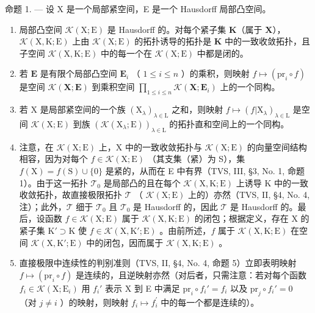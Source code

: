 命题 1. --- 设 X 是一个局部紧空间，E 是一个 Hausdorff 局部凸空间。

\begin{enumerate}
\def\labelenumi{(\roman{enumi})}
\item
  局部凸空间 \(\mathcal{K}(\mathrm{X};\mathrm{E})\) 是 Hausdorff 的。对每个紧子集 \(\mathbf{K}\)（属于 \(\mathbf{X}\)），\(\mathcal{K}(\mathrm{X},\mathrm{K};\mathrm{E})\) 上由 \(\mathcal{K}(\mathrm{X};\mathrm{E})\) 的拓扑诱导的拓扑是 \(\mathbf{K}\) 中的一致收敛拓扑，且子空间 \(\mathcal{K}(\mathrm{X},\mathrm{K};\mathrm{E})\) 中的每一个在 \(\mathcal{K}(\mathrm{X};\mathrm{E})\) 中都是闭的。
\item
  若 \(\mathbf{E}\) 是有限个局部凸空间 \(\mathbf{E}_i\) （ \(1 \leqslant i \leqslant n\) ）的乘积，则映射 \(f \mapsto (\mathrm{pr}_i \circ f)\) 是空间 \(\mathcal{K}(\mathbf{X};\mathbf{E})\) 到乘积空间 \(\prod_{1 \leqslant i \leqslant n} \mathcal{K}(\mathbf{X};\mathbf{E}_i)\) 上的一个同构。
\item
  若 \(\mathrm{X}\) 是局部紧空间的一个族 \((\mathrm{X}_{\lambda})_{\lambda \in \mathrm{L}}\) 之和，则映射 \(f \mapsto (f|\mathrm{X}_{\lambda})_{\lambda \in \mathrm{L}}\) 是空间 \(\mathcal{K}(\mathrm{X};\mathrm{E})\) 到族 \((\mathcal{K}(\mathrm{X}_{\lambda};\mathrm{E}))_{\lambda \in \mathrm{L}}\) 的拓扑直和空间上的一个同构。
\item
  注意，在 \(\mathcal{K}(\mathrm{X};\mathrm{E})\) 上，X 中的一致收敛拓扑与 \(\mathcal{K}(\mathrm{X};\mathrm{E})\) 的向量空间结构相容，因为对每个 \(f\in \mathcal{K}(\mathrm{X};\mathrm{E})\) （其支集（紧）为 S），集 \(f(\mathrm{X}) = f(\mathrm{S})\cup \{0\}\) 是紧的，从而在 E 中有界（TVS, III, §3, No. 1, 命题 1）。由于这一拓扑 \(\mathcal{T}_0\) 是局部凸的且在每个 \(\mathcal{K}(\mathrm{X},\mathrm{K};\mathrm{E})\) 上诱导 K 中的一致收敛拓扑，故直接极限拓扑 \(\mathcal{T}\) （ \(\mathcal{K}(\mathrm{X};\mathrm{E})\) 上的）亦然（TVS, II, §4, No. 4, 注）；此外，\(\mathcal{T}\) 细于 \(\mathcal{T}_0\) 且 \(\mathcal{T}_0\) 是 Hausdorff 的，因此 \(\mathcal{T}\) 是 Hausdorff 的。最后，设函数 \(f\in \mathcal{K}(\mathrm{X};\mathrm{E})\) 属于 \(\mathcal{K}(\mathrm{X},\mathrm{K};\mathrm{E})\) 的闭包；根据定义，存在 X 的紧子集 \(\mathrm{K}'\supset \mathrm{K}\) 使 \(f\in \mathcal{K}(\mathrm{X},\mathrm{K}';\mathrm{E})\) 。由前所述，\(f\) 属于 \(\mathcal{K}(\mathrm{X},\mathrm{K};\mathrm{E})\) 在空间 \(\mathcal{K}(\mathrm{X},\mathrm{K}';\mathrm{E})\) 中的闭包，因而属于 \(\mathcal{K}(\mathrm{X},\mathrm{K};\mathrm{E})\) 。
\item
  直接极限中连续性的判别准则（TVS, II, §4, No. 4, 命题 5）立即表明映射 \(f \mapsto (\mathrm{pr}_i \circ f)\) 是连续的，且逆映射亦然（对后者，只需注意：若对每个函数 \(f_i \in \mathcal{K}(\mathrm{X};\mathrm{E}_i)\) 用 \(f_i'\) 表示 X 到 E 中满足 \(\mathrm{pr}_i\circ f_i' = f_i\) 以及 \(\mathrm{pr}_j\circ f_i' = 0\) （对 \(j\neq i\) ）的映射，则映射 \(f_{i}\mapsto f_{i}^{\prime}\) 中的每一个都是连续的）。

\end{enumerate}
